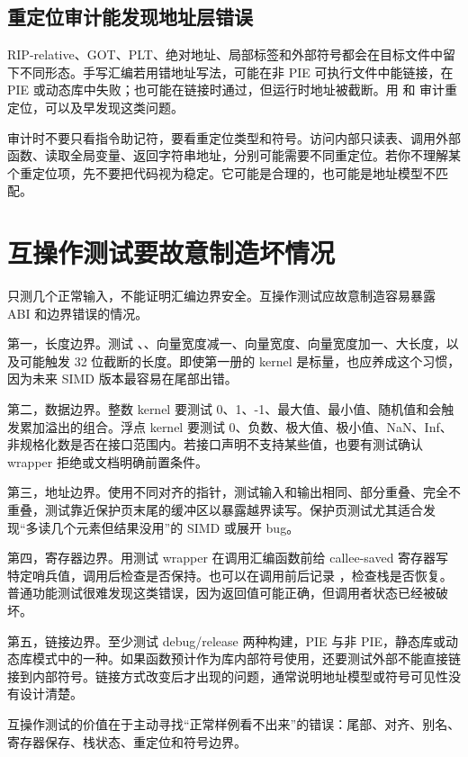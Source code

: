 \subsection{重定位审计能发现地址层错误}

RIP-relative、GOT、PLT、绝对地址、局部标签和外部符号都会在目标文件中留下不同形态。手写汇编若用错地址写法，可能在非 PIE 可执行文件中能链接，在 PIE 或动态库中失败；也可能在链接时通过，但运行时地址被截断。用  和  审计重定位，可以及早发现这类问题。

审计时不要只看指令助记符，要看重定位类型和符号。访问内部只读表、调用外部函数、读取全局变量、返回字符串地址，分别可能需要不同重定位。若你不理解某个重定位项，先不要把代码视为稳定。它可能是合理的，也可能是地址模型不匹配。

\section{互操作测试要故意制造坏情况}

只测几个正常输入，不能证明汇编边界安全。互操作测试应故意制造容易暴露 ABI 和边界错误的情况。

第一，长度边界。测试 、、向量宽度减一、向量宽度、向量宽度加一、大长度，以及可能触发 32 位截断的长度。即使第一册的 kernel 是标量，也应养成这个习惯，因为未来 SIMD 版本最容易在尾部出错。

第二，数据边界。整数 kernel 要测试 0、1、-1、最大值、最小值、随机值和会触发累加溢出的组合。浮点 kernel 要测试 0、负数、极大值、极小值、NaN、Inf、非规格化数是否在接口范围内。若接口声明不支持某些值，也要有测试确认 wrapper 拒绝或文档明确前置条件。

第三，地址边界。使用不同对齐的指针，测试输入和输出相同、部分重叠、完全不重叠，测试靠近保护页末尾的缓冲区以暴露越界读写。保护页测试尤其适合发现“多读几个元素但结果没用”的 SIMD 或展开 bug。

第四，寄存器边界。用测试 wrapper 在调用汇编函数前给 callee-saved 寄存器写特定哨兵值，调用后检查是否保持。也可以在调用前后记录 ，检查栈是否恢复。普通功能测试很难发现这类错误，因为返回值可能正确，但调用者状态已经被破坏。

第五，链接边界。至少测试 debug/release 两种构建，PIE 与非 PIE，静态库或动态库模式中的一种。如果函数预计作为库内部符号使用，还要测试外部不能直接链接到内部符号。链接方式改变后才出现的问题，通常说明地址模型或符号可见性没有设计清楚。

\begin{keyidea}
互操作测试的价值在于主动寻找“正常样例看不出来”的错误：尾部、对齐、别名、寄存器保存、栈状态、重定位和符号边界。
\end{keyidea}

